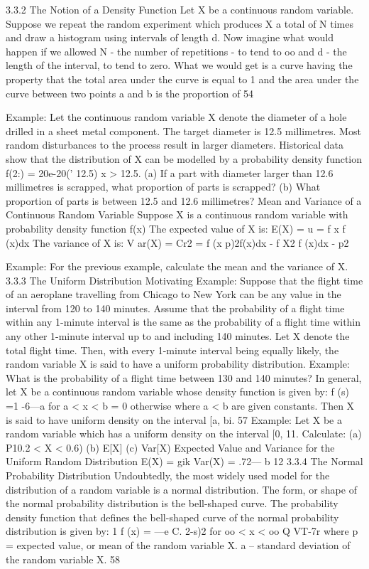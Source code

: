 3.3.2 The Notion of a Density Function 
Let X be a continuous random variable. Suppose we repeat the random experiment which produces X a total of N times and draw a histogram using intervals of length d. Now imagine what would happen if we allowed N - the number of repetitions - to tend to oo and d - the length of the interval, to tend to zero. What we would get is a curve having the property that the total area under the curve is equal to 1 and the area under the curve between two points a and b is the proportion of 
54 


Example: Let the continuous random variable X denote the diameter of a hole drilled in a sheet metal component. The target diameter is 12.5 millimetres. Most random disturbances to the process result in larger diameters. Historical data show that the distribution of X can be modelled by a probability density function f(2:) = 20e-20(' 12.5) x > 12.5. 
(a) If a part with diameter larger than 12.6 millimetres is scrapped, what proportion of parts is scrapped? (b) What proportion of parts is between 12.5 and 12.6 millimetres? 
Mean and Variance of a Continuous Random Variable Suppose X is a continuous random variable with probability density function f(x) The expected value of X is: 
E(X) = u = f x f (x)dx 
The variance of X is: 
V ar(X) = Cr2 = f (x p)2f(x)dx - f X2 f (x)dx - p2 


Example: 
For the previous example, calculate the mean and the variance of X. 
3.3.3 The Uniform Distribution 
Motivating Example: Suppose that the flight time of an aeroplane travelling from Chicago to New York can be any value in the interval from 120 to 140 minutes. Assume that the probability of a flight time within any 1-minute interval is the same as the probability of a flight time within any other 1-minute interval up to and including 140 minutes. Let X denote the total flight time. Then, with every 1-minute interval being equally likely, the random variable X is said to have a uniform probability distribution. 
Example: 
What is the probability of a flight time between 130 and 140 minutes? 
In general, let X be a continuous random variable whose density function is given by: 
f (s) =1 -6---a for a < x < b 
= 0 otherwise 
where a < b are given constants. Then X is said to have uniform density on the interval [a, bi. 
57 
Example: 
Let X be a random variable which has a uniform density on the interval [0, 11. Calculate: 
(a) P10.2 < X < 0.6) (b) E[X] (c) Var[X) 
Expected Value and Variance for the Uniform Random Distribution 
E(X) = gik Var(X) = .72— b 12 
3.3.4 The Normal Probability Distribution 
Undoubtedly, the most widely used model for the distribution of a random variable is a normal distribution. The form, or shape of the normal probability distribution is the bell-shaped curve. The probability density function that defines the bell-shaped curve of the normal probability distribution is given by: 
1 f (x) = —e C. 2-s)2 for oo < x < oo Q VT-7r 
where p = expected value, or mean of the random variable X. a -- standard deviation of the random variable X. 
58 

